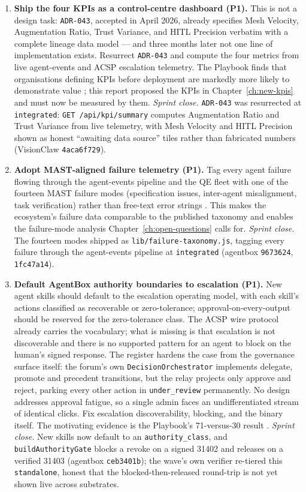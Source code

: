 \begin{enumerate}
  \item \textbf{Ship the four KPIs as a control-centre dashboard (P1).} This is not a design task: \texttt{ADR-043}, accepted in April 2026, already specifies Mesh Velocity, Augmentation Ratio, Trust Variance, and HITL Precision verbatim with a complete lineage data model --- and three months later not one line of implementation exists. Resurrect \texttt{ADR-043} and compute the four metrics from live agent-events and ACSP escalation telemetry. The Playbook finds that organisations defining KPIs before deployment are markedly more likely to demonstrate value \parencite{Pereira2026Playbook}; this report proposed the KPIs in Chapter~\ref{ch:new-kpis} and must now be measured by them. \emph{Sprint close.} \texttt{ADR-043} was resurrected at \texttt{integrated}: \texttt{GET /api/kpi/summary} computes Augmentation Ratio and Trust Variance from live telemetry, with Mesh Velocity and HITL Precision shown as honest ``awaiting data source'' tiles rather than fabricated numbers (VisionClaw \texttt{4aca6f729}).

  \item \textbf{Adopt MAST-aligned failure telemetry (P1).} Tag every agent failure flowing through the agent-events pipeline and the QE fleet with one of the fourteen MAST failure modes (specification issues, inter-agent misalignment, task verification) rather than free-text error strings \parencite{Cemri2025}. This makes the ecosystem's failure data comparable to the published taxonomy and enables the failure-mode analysis Chapter~\ref{ch:open-questions} calls for. \emph{Sprint close.} The fourteen modes shipped as \texttt{lib/failure-taxonomy.js}, tagging every failure through the agent-events pipeline at \texttt{integrated} (agentbox \texttt{9673624}, \texttt{1fc47a14}).

  \item \textbf{Default AgentBox authority boundaries to escalation (P1).} New agent skills should default to the escalation operating model, with each skill's actions classified as recoverable or zero-tolerance; approval-on-every-output should be reserved for the zero-tolerance class. The ACSP wire protocol already carries the vocabulary; what is missing is that escalation is not discoverable and there is no supported pattern for an agent to block on the human's signed response. The register hardens the case from the governance surface itself: the forum's own \texttt{DecisionOrchestrator} implements delegate, promote and precedent transitions, but the relay projects only approve and reject, parking every other action in \texttt{under\_review} permanently. No design addresses approval fatigue, so a single admin faces an undifferentiated stream of identical clicks. Fix escalation discoverability, blocking, and the binary itself. The motivating evidence is the Playbook's 71-versus-30 result \parencite{Pereira2026Playbook}. \emph{Sprint close.} New skills now default to an \texttt{authority\_class}, and \texttt{buildAuthorityGate} blocks a revoke on a signed 31402 and releases on a verified 31403 (agentbox \texttt{ceb3401b}); the wave's own verifier re-tiered this \texttt{standalone}, honest that the blocked-then-released round-trip is not yet shown live across substrates.


\end{enumerate}
